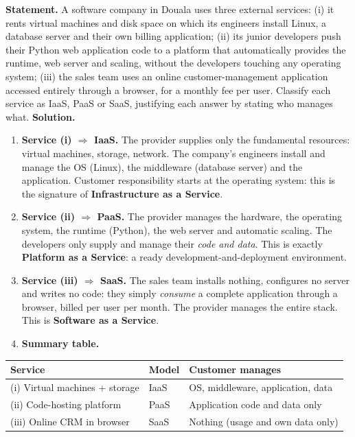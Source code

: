 \documentclass[11pt]{article}
\begin{document}
\begin{exoresolu}
\textbf{Statement.} A software company in Douala uses three external services: (i) it rents virtual machines and disk space on which its engineers install Linux, a database server and their own billing application; (ii) its junior developers push their Python web application code to a platform that automatically provides the runtime, web server and scaling, without the developers touching any operating system; (iii) the sales team uses an online customer-management application accessed entirely through a browser, for a monthly fee per user. Classify each service as IaaS, PaaS or SaaS, justifying each answer by stating who manages what.
\tcblower
\textbf{Solution.}
\begin{enumerate}
\item \textbf{Service (i) $\Rightarrow$ IaaS.} The provider supplies only the fundamental resources: virtual machines, storage, network. The company's engineers install and manage the OS (Linux), the middleware (database server) and the application. Customer responsibility starts at the operating system: this is the signature of \textbf{Infrastructure as a Service}.
\item \textbf{Service (ii) $\Rightarrow$ PaaS.} The provider manages the hardware, the operating system, the runtime (Python), the web server and automatic scaling. The developers only supply and manage their \emph{code and data}. This is exactly \textbf{Platform as a Service}: a ready development-and-deployment environment.
\item \textbf{Service (iii) $\Rightarrow$ SaaS.} The sales team installs nothing, configures no server and writes no code: they simply \emph{consume} a complete application through a browser, billed per user per month. The provider manages the entire stack. This is \textbf{Software as a Service}.
\item \textbf{Summary table.}
\end{enumerate}
\begin{center}
\begin{tabularx}{\linewidth}{|l|X|X|}
\hline
\rowcolor{popblueL} \textbf{Service} & \textbf{Model} & \textbf{Customer manages} \\
\hline
(i) Virtual machines + storage & IaaS & OS, middleware, application, data \\
\hline
(ii) Code-hosting platform & PaaS & Application code and data only \\
\hline
(iii) Online CRM in browser & SaaS & Nothing (usage and own data only) \\
\hline
\end{tabularx}
\end{center}
\end{exoresolu}
\end{document}
